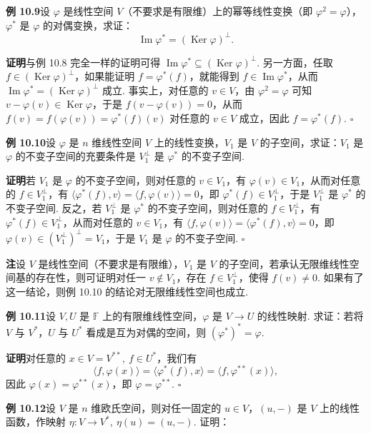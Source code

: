 \documentclass[UTF8,12pt,a4paper,fontset=fandol]{ctexart}
\begin{document}
\noindent\textbf{例 10.9}\quad 设 $\varphi$ 是线性空间 $V$（不要求是有限维）上的幂等线性变换（即 $\varphi^2=\varphi$），$\varphi^*$ 是 $\varphi$ 的对偶变换，求证：
\[
\operatorname{Im}\varphi^*=(\operatorname{Ker}\varphi)^\perp.
\]

\noindent\textbf{证明}\quad 与例 10.8 完全一样的证明可得 $\operatorname{Im}\varphi^*\subseteq(\operatorname{Ker}\varphi)^\perp$. 另一方面，任取 $f\in(\operatorname{Ker}\varphi)^\perp$，如果能证明 $f=\varphi^*(f)$，就能得到 $f\in\operatorname{Im}\varphi^*$，从而 $\operatorname{Im}\varphi^*=(\operatorname{Ker}\varphi)^\perp$ 成立. 事实上，对任意的 $v\in V$，由 $\varphi^2=\varphi$ 可知 $v-\varphi(v)\in\operatorname{Ker}\varphi$，于是 $f(v-\varphi(v))=0$，从而 $f(v)=f(\varphi(v))=\varphi^*(f)(v)$ 对任意的 $v\in V$ 成立，因此 $f=\varphi^*(f)$. $\square$

\noindent\textbf{例 10.10}\quad 设 $\varphi$ 是 $n$ 维线性空间 $V$ 上的线性变换，$V_1$ 是 $V$ 的子空间，求证：$V_1$ 是 $\varphi$ 的不变子空间的充要条件是 $V_1^\perp$ 是 $\varphi^*$ 的不变子空间.

\noindent\textbf{证明}\quad 若 $V_1$ 是 $\varphi$ 的不变子空间，则对任意的 $v\in V_1$，有 $\varphi(v)\in V_1$，从而对任意的 $f\in V_1^\perp$，有 $\langle\varphi^*(f),v\rangle=\langle f,\varphi(v)\rangle=0$，即 $\varphi^*(f)\in V_1^\perp$，于是 $V_1^\perp$ 是 $\varphi^*$ 的不变子空间. 反之，若 $V_1^\perp$ 是 $\varphi^*$ 的不变子空间，则对任意的 $f\in V_1^\perp$，有 $\varphi^*(f)\in V_1^\perp$，从而对任意的 $v\in V_1$，有 $\langle f,\varphi(v)\rangle=\langle\varphi^*(f),v\rangle=0$，即 $\varphi(v)\in(V_1^\perp)^\perp=V_1$，于是 $V_1$ 是 $\varphi$ 的不变子空间. $\square$

\noindent\textbf{注}\quad 设 $V$ 是线性空间（不要求是有限维），$V_1$ 是 $V$ 的子空间，若承认无限维线性空间基的存在性，则可证明对任一 $v\notin V_1$，存在 $f\in V_1^\perp$，使得 $f(v)\ne0$. 如果有了这一结论，则例 10.10 的结论对无限维线性空间也成立.

\noindent\textbf{例 10.11}\quad 设 $V,U$ 是 $\mathbb{F}$ 上的有限维线性空间，$\varphi$ 是 $V\to U$ 的线性映射. 求证：若将 $V$ 与 $V^*$，$U$ 与 $U^*$ 看成是互为对偶的空间，则 $(\varphi^*)^*=\varphi$.

\noindent\textbf{证明}\quad 对任意的 $x\in V=V^{**},\ f\in U^*$，我们有
\[
\langle f,\varphi(x)\rangle=\langle\varphi^*(f),x\rangle=\langle f,\varphi^{**}(x)\rangle,
\]
因此 $\varphi(x)=\varphi^{**}(x)$，即 $\varphi=\varphi^{**}$. $\square$

\noindent\textbf{例 10.12}\quad 设 $V$ 是 $n$ 维欧氏空间，则对任一固定的 $u\in V$，$(u,-)$ 是 $V$ 上的线性函数，作映射 $\eta:V\to V^*,\ \eta(u)=(u,-)$. 证明：
\end{document}
